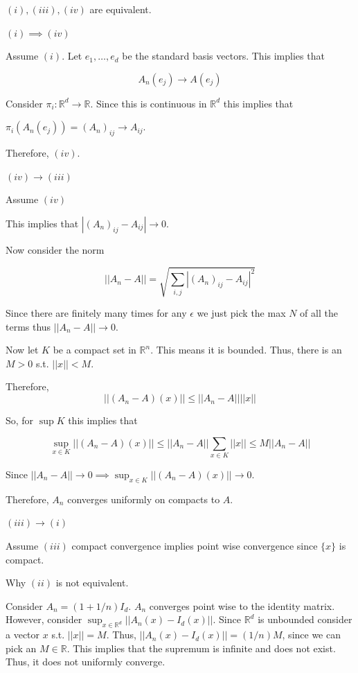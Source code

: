 \documentclass[12pt, letterpaper]{article}
\newcommand{\R}{\mathbb{R}}
\begin{document}
\begin{problemproof}
    $(i),(iii),(iv)$ are equivalent.

    $(i) \implies (iv)$

    Assume $(i)$. Let $e_1,\dots,e_d$ be the standard basis vectors. This implies that

    \[A_n(e_j) \to A(e_j)\]

    Consider $\pi_i : \R^d \to \R$. Since this is continuous in $\R^d$ this implies that 
    
    $\pi_i(A_n(e_j))=(A_n)_{ij} \to A_{ij}$.

    Therefore, $(iv)$.

    $(iv) \to (iii)$
    
    Assume $(iv)$

    This implies that $|(A_n)_{ij}-A_{ij}| \to 0$.

    Now consider the norm

    \[|| A_n -A || = \sqrt{\sum_{i,j}|(A_n)_{ij}-A_{ij}|^2}\]

    Since there are finitely many times for any $\epsilon$ we just pick the max $N$ of all the terms thus $||A_n -A|| \to 0$.

    Now let $K$ be a compact set in $\R^n$. This means it is bounded. Thus, there is an $M > 0$ s.t. $||x|| < M$.

    Therefore,
    \[||(A_n-A)(x)|| \leq ||A_n-A||||x||\]

    So, for $\sup K$ this implies that 

    \[\sup_{x \in K} || (A_n-A)(x)|| \leq||A_n-A|| \sum_{x \in K}||x|| \leq M ||A_n-A||\]

    Since $||A_n-A|| \to 0 \implies \sup_{x \in K} || (A_n-A)(x)|| \to 0$.

    Therefore, $A_n$ converges uniformly on compacts to $A$.

    $(iii) \to (i)$

    Assume $(iii)$ compact convergence implies point wise convergence since $\{x\}$ is compact.

    Why $(ii)$ is not equivalent.

    Consider $A_n=(1+1/n)I_d$. $A_n$ converges point wise to the identity matrix. However, consider $\sup_{x \in \R^d}||A_n(x) -I_d(x)||$. Since $\R^d$ is unbounded consider a vector $x$ s.t. $||x||=M$. Thus, $||A_n(x)-I_d(x)||=(1/n)M$, since we can pick an $M \in \R$. This implies that the supremum is infinite and does not exist. Thus, it does not uniformly converge.
\end{problemproof}
\end{document}
